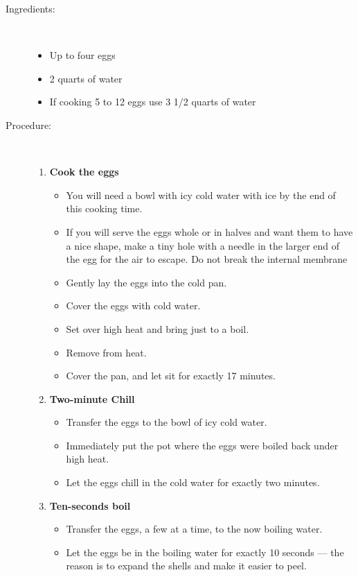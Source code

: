 \documentclass[11pt,letterpaper]{article}
\begin{document}
\begin{description}

\item[Ingredients:]\ \\
	\begin{itemize}
	\item Up to four eggs
	\item 2 quarts of water
	\item If cooking 5 to 12 eggs use 3 1/2 quarts of water
	\end{itemize}

\item[Procedure:]\ \\
	\begin{enumerate}
	\item {\bf Cook the eggs }
	\begin{itemize}
	\item You will need a bowl with icy cold water with ice by the end of this cooking time.
	\item If you will serve the eggs whole or in halves and want them to have a nice shape, make a tiny hole with a needle in the larger end of the egg for the air to escape. Do not break the internal membrane
	\item Gently lay the eggs into the cold pan.
        \item Cover the eggs with cold water.
	\item Set over high heat and bring just to a boil.
	\item Remove from heat.
	\item Cover the pan, and let sit for exactly 17 minutes.
	\end{itemize}
	\item {\bf Two-minute Chill}
	\begin{itemize}
	\item Transfer the eggs to the bowl of icy cold water.
	\item Immediately put the pot where the eggs were boiled back under high heat.
	\item Let the eggs chill in the cold water for exactly two minutes.
	\end{itemize}
	\item {\bf Ten-seconds boil}
	\begin{itemize}
	\item Transfer the eggs, a few at a time, to the now boiling water.
	\item Let the eggs be in the boiling water for exactly 10 seconds --- the reason is to expand the shells and make it easier to peel.

\end{itemize}
\end{enumerate}
\end{description}
\end{document}
